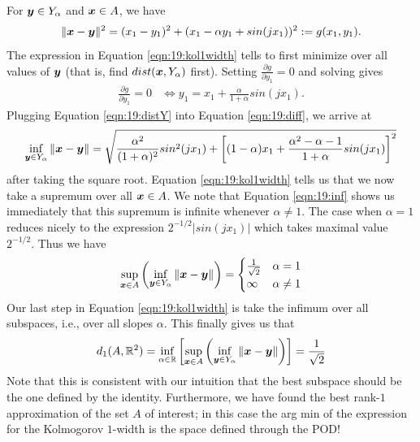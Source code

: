 For $\boldsymbol{y} \in Y_{\alpha}$ and $\boldsymbol{x} \in A$, we have
\begin{align} \label{eqn:19:diff}
\|\boldsymbol{x} - \boldsymbol{y}\|^2 = (x_1 - y_1)^2 + (x_1 - \alpha y_1 + sin(j x_1))^2 := g(x_1,y_1).
\end{align}
The expression in Equation \eqref{eqn:19:kol1width} tells to first minimize over all values of $\boldsymbol{y}$ (that is, find $dist(\boldsymbol{x}, Y_{\alpha})$ first). Setting $\frac{\partial g}{\partial y_1} = 0$ and solving gives
\begin{align} \label{eqn:19:distY}
\frac{\partial g}{\partial y_1} = 0 &\Leftrightarrow y_1 = x_1 + \frac{\alpha}{1 + \alpha} sin(jx_1).
\end{align}
Plugging Equation \eqref{eqn:19:distY} into Equation \eqref{eqn:19:diff}, we arrive at
\begin{align} \label{eqn:19:inf}
\inf_{\boldsymbol{y} \in Y_{\alpha}} \|\boldsymbol{x} - \boldsymbol{y}\| = \sqrt{\frac{\alpha^2}{(1+\alpha)^2} sin^2(jx_1) + \left[ (1-\alpha)x_1 + \frac{\alpha^2 - \alpha - 1}{1+\alpha} sin(jx_1)\right]^2}
\end{align}
after taking the square root. Equation \eqref{eqn:19:kol1width} tells us that we now take a supremum over all $\boldsymbol{x} \in A$. We note that Equation \eqref{eqn:19:inf} shows us immediately that this supremum is infinite whenever $\alpha \neq 1$. The case when $\alpha=1$ reduces nicely to the expression $2^{-1/2} |sin(jx_1)|$ which takes maximal value $2^{-1/2}$. Thus we have
\begin{align}
    \sup_{\boldsymbol{x} \in A} \left( \inf_{\boldsymbol{y} \in Y_{\alpha}} \|\boldsymbol{x} - \boldsymbol{y}\|\right) = \begin{cases}
    \frac{1}{\sqrt{2}} & \alpha = 1 \\
    \infty & \alpha \neq 1
    \end{cases}
\end{align}
Our last step in Equation \eqref{eqn:19:kol1width} is take the infimum over all subspaces, i.e., over all slopes $\alpha$. This finally gives us that 
\begin{align} \label{eqn:19:kolfinal}
d_{1}(A,\mathbb{R}^2) = \inf_{\alpha \in \mathbb{R}} \left[ \sup_{\boldsymbol{x} \in A} \left( \inf_{\boldsymbol{y} \in Y_{\alpha}} \|\boldsymbol{x} - \boldsymbol{y} \| \right) \right] = \frac{1}{\sqrt{2}}
\end{align}
Note that this is consistent with our intuition that the best subspace should be the one defined by the identity. Furthermore, we have found the best rank-$1$ approximation of the set $A$ of interest; in this case the arg min of the expression for the Kolmogorov $1$-width is the space defined through the POD!

